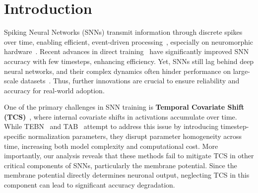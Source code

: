 \section{Introduction}
\label{sec:introduction}


Spiking Neural Networks (SNNs) transmit information through discrete spikes over time, enabling efficient, event-driven processing~\cite{cao:2015, esser:2016, neftci:2018, roy:2019, cramer:2022, rathi:2023}, especially on neuromorphic hardware~\cite{merolla:2014, akopyan:2015, davies:2018}. Recent advances in direct training~\cite{wu:2018, wu:2019} have significantly improved SNN accuracy with few timesteps, enhancing efficiency. Yet, SNNs still lag behind deep neural networks, and their complex dynamics often hinder performance on large-scale datasets~\cite{review_guo:2023, review_zhou:2024}. Thus, further innovations are crucial to ensure reliability and accuracy for real-world adoption.

One of the primary challenges in SNN training is \textbf{Temporal Covariate Shift (TCS)}~\cite{bntt:2020}, where internal covariate shifts in activations accumulate over time. While TEBN~\cite{tebn:2022} and TAB~\cite{tab:2024} attempt to address this issue by introducing timestep-specific normalization parameters, they disrupt parameter homogeneity across time, increasing both model complexity and computational cost. More importantly, our analysis reveals that these methods fail to mitigate TCS in other critical components of SNNs, particularly the membrane potential. Since the membrane potential directly determines neuronal output, neglecting TCS in this component can lead to significant accuracy degradation.

